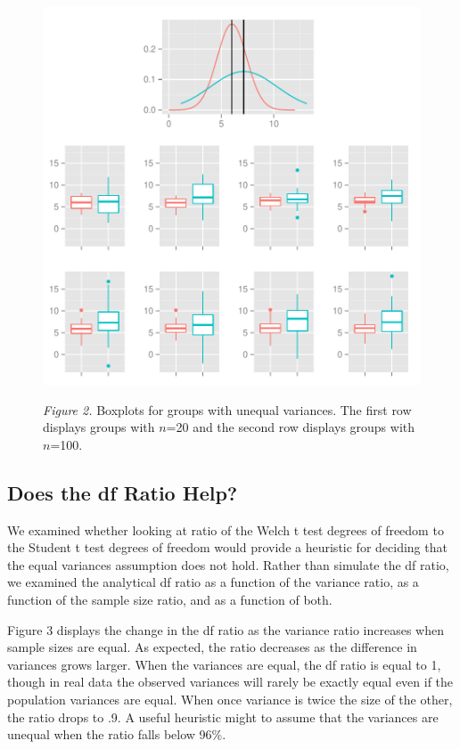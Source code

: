 \documentclass[man,a4paper,noextraspace,apacite]{apa6}
\begin{document}
\begin{figure}
\includegraphics{WelchManuscript-abridged-varDifferentBoxplots}

\textit{Figure 2.} Boxplots for groups with unequal variances. The first row displays groups with $n$=20 and the second row displays groups with $n$=100.
\end{figure}


\subsection{Does the df Ratio Help?}
    We examined whether looking at ratio of the Welch t test degrees of freedom to the Student t test degrees of freedom would provide a heuristic for deciding that the equal variances assumption does not hold. Rather than simulate the df ratio, we examined the analytical df ratio as a function of the variance ratio, as a function of the sample size ratio, and as a function of both. 

    Figure 3 displays the change in the df ratio as the variance ratio increases when sample sizes are equal. As expected, the ratio decreases as the difference in variances grows larger. When the variances are equal, the df ratio is equal to 1, though in real data the observed variances will rarely be exactly equal even if the population variances are equal. When once variance is twice the size of the other, the ratio drops to .9. A useful heuristic might to assume that the variances are unequal when the ratio falls below 96\%.
  
\end{document}
